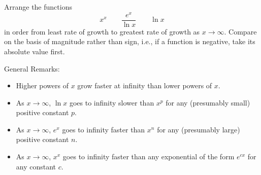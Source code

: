 \documentclass{ximera}
\begin{document}
\begin{question}%

Arrange the functions 
\[ x^{x} \qquad \frac{e^{x}}{\ln{x}} \qquad \ln{x} \]
in order from least rate of growth to greatest rate of growth as \(x \rightarrow \infty\). Compare on the basis of magnitude rather than sign, i.e., if a function is negative, take its absolute value first.
\begin{multiplechoice}
\end{multiplechoice}
\begin{feedback}
General Remarks:
\begin{itemize} \item Higher powers of \(x\) grow faster at infinity than lower powers of \(x\).
\item As \(x \rightarrow \infty\), \(\ln x\) goes to infinity slower than \(x^p\) for any (presumably small) positive constant \(p\).
\item As \(x \rightarrow \infty\), \(e^x\) goes to infinity faster than \(x^n\) for any (presumably large) positive constant \(n\).
\item As \(x \rightarrow \infty\), \(x^x\) goes to infinity faster than any exponential of the form \(e^{cx}\) for any constant \(c\).
\end{itemize}
\end{feedback}

\end{question}
\end{document}
